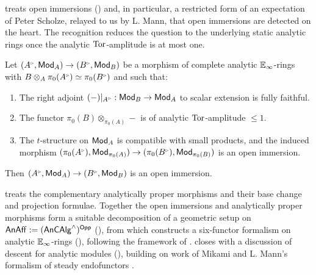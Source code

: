  treats open immersions () and, in particular, a restricted form of an expectation of Peter Scholze, relayed to us by L. Mann, that open immersions are detected on the heart. The recognition reduces the question to the underlying static analytic rings once the analytic $\mathrm{Tor}$-amplitude is at most one.
\begin{proposition*}[\ref{prop: open immersion detected on static rings}]
    Let $(A^{\tri},\Mod_{A})\to(B^{\tri},\Mod_{B})$ be a morphism of complete analytic $\mathbb{E}_{\infty}$-rings with $B\otimes_{A}\pi_{0}(A^{\tri})\simeq\pi_{0}(B^{\tri})$ and such that:
    \begin{enumerate}[label=(\roman*)]
        \item The right adjoint $(-)|_{A^{\tri}}:\Mod_{B}\to\Mod_{A}$ to scalar extension is fully faithful.
        \item The functor $\pi_{0}(B)\otimes_{\pi_{0}(A)}-$ is of analytic $\mathrm{Tor}$-amplitude $\leq 1$.
        \item The $t$-structure on $\mathsf{Mod}_{A}$ is compatible with small products, and the induced morphism $(\pi_{0}(A^{\tri}),\Mod_{\pi_{0}(A)})\to(\pi_{0}(B^{\tri}),\Mod_{\pi_{0}(B)})$ is an open immersion.
    \end{enumerate}
    Then $(A^{\tri},\Mod_{A})\to(B^{\tri},\Mod_{B})$ is an open immersion.
\end{proposition*}
 treats the complementary analytically proper morphisms and their base change and projection formulae. Together the open immersions and analytically proper morphisms form a suitable decomposition of a geometric setup on $\mathsf{An}\mathsf{Aff}:=(\mathsf{An}\mathsf{CAlg}^{\wedge})^{\mathsf{Opp}}$ (), from which  constructs a six-functor formalism on analytic $\mathbb{E}_{\infty}$-rings (), following the framework of \cite[\S 2-3]{HeyerMann6FF}.  closes with a discussion of descent for analytic modules (), building on work of Mikami \cite[\S 2]{MikamiFFDescent} and L. Mann's formalism of steady endofunctors \cite[\S 2.5-2.6]{MannRigid6FF}.
